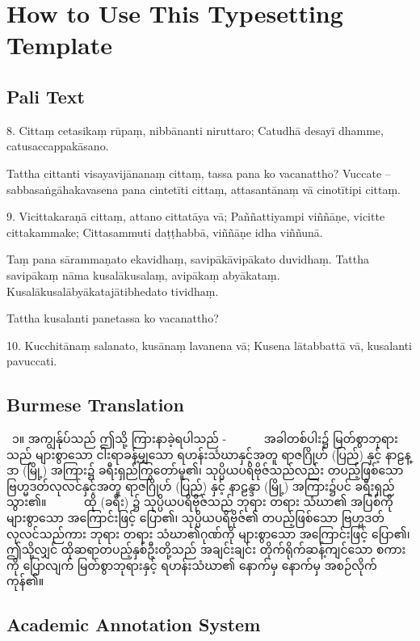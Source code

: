 \chapter{How to Use This Typesetting Template}

\starthere

\section{Pali Text}
8.
Cittaṃ cetasikaṃ rūpaṃ, nibbānanti niruttaro;
Catudhā desayī dhamme, catusaccappakāsano.

Tattha cittanti visayavijānanaṃ cittaṃ, tassa pana ko vacanattho? Vuccate – sabbasaṅgāhakavasena pana cintetīti cittaṃ, attasantānaṃ vā cinotītipi cittaṃ.

9.
Vicittakaraṇā cittaṃ, attano cittatāya vā;
Paññattiyampi viññāṇe, vicitte cittakammake;
Cittasammuti daṭṭhabbā, viññāṇe idha viññunā.

Taṃ pana sārammaṇato ekavidhaṃ, savipākāvipākato duvidhaṃ. Tattha savipākaṃ nāma kusalākusalaṃ, avipākaṃ abyākataṃ. Kusalākusalābyākatajātibhedato tividhaṃ.

Tattha kusalanti panetassa ko vacanattho?

10.
Kucchitānaṃ salanato, kusānaṃ lavanena vā;
Kusena lātabbattā vā, kusalanti pavuccati.

\section{Burmese Translation}
 ၁။ အကျွန်ုပ်သည် ဤသို့ ကြားနာခဲ့ရပါသည် -
       အခါတစ်ပါး၌ မြတ်စွာဘုရားသည် များစွာသော ငါးရာခန့်မျှသော ရဟန်းသံဃာနှင့်အတူ ရာဇဂြိုဟ် (ပြည်) နှင့် နာဠန္ဒာ (မြို့) အကြား၌ ခရီးရှည်ကြွတော်မူ၏၊ သုပ္ပိယပရိဗိုဇ်သည်လည်း တပည့်ဖြစ်သော ဗြဟ္မဒတ်လုလင်နှင့်အတူ ရာဇဂြိုဟ် (ပြည်) နှင့် နာဠန္ဒာ (မြို့) အကြား၌ပင် ခရီးရှည်သွား၏။
       ထို (ခရီး) ၌ သုပ္ပိယပရိဗိုဇ်သည် ဘုရား တရား သံဃာ၏ အပြစ်ကို များစွာသော အကြောင်းဖြင့် ပြော၏၊ သုပ္ပိယပရိဗိုဇ်၏ တပည့်ဖြစ်သော ဗြဟ္မဒတ်လုလင်သည်ကား ဘုရား တရား သံဃာ၏ဂုဏ်ကို များစွာသော အကြောင်းဖြင့် ပြော၏၊ ဤသို့လျှင် ထိုဆရာတပည့်နှစ်ဦးတို့သည် အချင်းချင်း တိုက်ရိုက်ဆန့်ကျင်သော စကားကို ပြောလျက် မြတ်စွာဘုရားနှင့် ရဟန်းသံဃာ၏ နောက်မှ နောက်မှ အစဉ်လိုက်ကုန်၏။

\section{Academic Annotation System}


